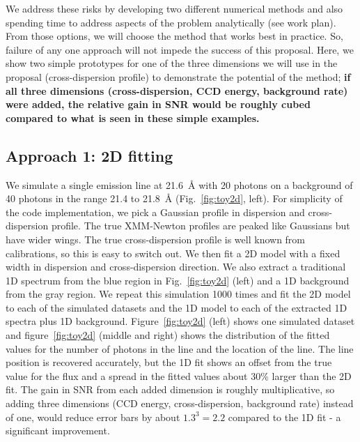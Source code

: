 \documentclass[fleqn,12pt,onecolumn]{SelfArx} %
\begin{document}
We address these risks by developing two different numerical methods and also spending time to address aspects of the problem analytically (see work plan). From those options, we will choose the method that works best in practice. So, failure of any one approach will not impede the success of this proposal. Here, we show two simple prototypes for one of the three dimensions we will use in the proposal (cross-dispersion profile) to demonstrate the potential of the method; \textbf{if all three dimensions (cross-dispersion, CCD energy, background rate) were added, the relative gain in SNR would be roughly cubed compared to what is seen in these simple examples.}

\subsection{Approach 1: 2D fitting}

We simulate a single emission line at 21.6~\AA{} with 20 photons on a background of 40 photons in the range 21.4 to 21.8~\AA{} (Fig.~\ref{fig:toy2d}, left). For simplicity of the code implementation, we pick a Gaussian profile in dispersion and cross-dispersion profile. The true XMM-Newton profiles are peaked like Gaussians but have wider wings. The true cross-dispersion profile is well known from calibrations, so this is easy to switch out. We then fit a 2D model with a fixed width in dispersion and cross-dispersion direction. We also extract a traditional 1D spectrum from the blue region in Fig.~\ref{fig:toy2d} (left) and a 1D background from the gray region. We repeat this simulation 1000 times and fit the 2D model to each of the simulated datasets and the 1D model to each of the extracted 1D spectra plus 1D background. Figure~\ref{fig:toy2d} (left) shows one simulated dataset and figure~\ref{fig:toy2d} (middle and right) shows the distribution of the fitted values for the number of photons in the line and the location of the line. The line position is recovered accurately, but the 1D fit shows an offset from the true value for the flux and a spread in the fitted values about 30\% larger than the 2D fit. %
The gain in SNR from each added dimension is roughly multiplicative, so adding three dimensions (CCD energy, cross-dispersion, background rate) instead of one, would reduce error bars by about $1.3^3=2.2$ compared to the 1D fit - a significant improvement.
\end{document}
